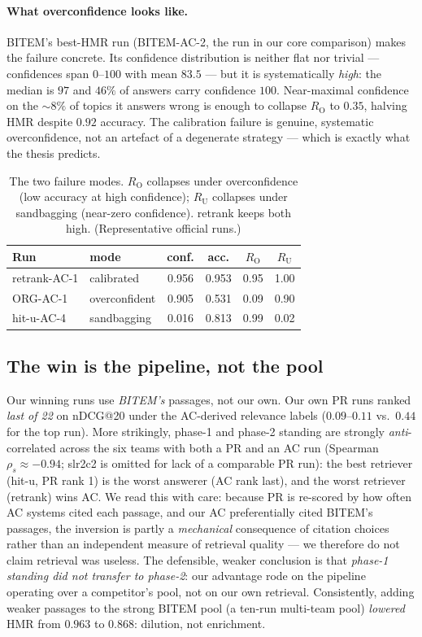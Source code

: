 \documentclass[sigconf,nonacm]{acmart}
\newcommand{\HMR}{\textsc{HMR}}
\newcommand{\RO}{R_{\mathrm{O}}}
\newcommand{\RU}{R_{\mathrm{U}}}
\begin{document}
\paragraph{What overconfidence looks like.} BITEM's best-\HMR{} run (BITEM-AC-2, the run in
our core comparison) makes the failure concrete. Its confidence
distribution is neither flat nor trivial --- confidences span $0$--$100$ with mean $83.5$
--- but it is systematically \emph{high}: the median is $97$ and $46\%$ of answers carry
confidence $100$. Near-maximal confidence on the $\sim\!8\%$ of topics it answers wrong is
enough to collapse $\RO$ to $0.35$, halving \HMR{} despite $0.92$ accuracy. The calibration
failure is genuine, systematic overconfidence, not an artefact of a degenerate
strategy --- which is exactly what the thesis predicts.

\begin{table}[t]
\caption{The two failure modes. $\RO$ collapses under overconfidence (low accuracy at high
confidence); $\RU$ collapses under sandbagging (near-zero confidence). retrank keeps both
high. (Representative official runs.)}
\label{tab:failure}
\small
\begin{tabular}{llcccc}
\toprule
Run & mode & conf. & acc. & $\RO$ & $\RU$ \\
\midrule
retrank-AC-1  & calibrated     & 0.956 & 0.953 & 0.95 & 1.00 \\
ORG-AC-1      & overconfident  & 0.905 & 0.531 & 0.09 & 0.90 \\
hit-u-AC-4    & sandbagging    & 0.016 & 0.813 & 0.99 & 0.02 \\
\bottomrule
\end{tabular}
\end{table}

\subsection{The win is the pipeline, not the pool}
\label{sec:pool}
Our winning runs use \emph{BITEM's} passages, not our own. Our own PR runs ranked
\emph{last of 22} on nDCG@20 under the AC-derived relevance labels ($0.09$--$0.11$ vs.\
$0.44$ for the top run). More strikingly, phase-1 and phase-2 standing are strongly
\emph{anti}-correlated across the six teams with both a PR and an AC run (Spearman
$\rho_s\approx-0.94$; slr2c2 is omitted for lack of a comparable PR run): the best retriever
(hit-u, PR rank 1) is the worst answerer (AC rank last), and the worst retriever (retrank)
wins AC. We read this with care: because PR is re-scored by how
often AC systems cited each passage, and our AC preferentially cited BITEM's passages, the
inversion is partly a \emph{mechanical} consequence of citation choices rather than an
independent measure of retrieval quality --- we therefore do not claim retrieval was
useless. The defensible, weaker conclusion is that \emph{phase-1 standing did not transfer
to phase-2}: our advantage rode on the pipeline operating over a competitor's pool, not on
our own retrieval. Consistently, adding weaker passages to the strong
BITEM pool (a ten-run multi-team pool) \emph{lowered} \HMR{} from $0.963$ to $0.868$:
dilution, not enrichment.
\end{document}
